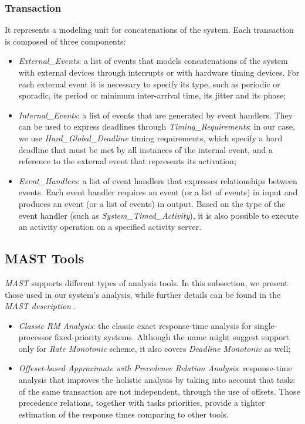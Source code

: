 \subsubsection{Transaction} 
It represents a modeling unit for concatenations of the system. Each transaction
is composed of three components:
\begin{itemize}
    \item \textit{External\_Events}: a list of events that models concatenations
    of the system with external devices through interrupts or with hardware
    timing devices. For each external event it is necessary to specify its type,
    such as periodic or sporadic, its period or minimum inter-arrival time, its
    jitter and its phase;
    \item \textit{Internal\_Events}: a list of events that are generated by
    event handlers. They can be used to express deadlines through
    \textit{Timing\_Requirements}: in our case, we use \textit{Hard\_Global\_Deadline}
    timing requirements, which specify a hard deadline that must be met by all
    instances of the internal event, and a reference to the external event that
    represents its activation;
    \item \textit{Event\_Handlers}: a list of event handlers that
    expresses relationships between events. Each event handler requires an event
    (or a list of events) in input and produces an event (or a list of events) in
    output. Based on the type of the event handler (such as
    \textit{System\_Timed\_Activity}), it is also possible to execute an activity
    operation on a specified activity server. 
\end{itemize}

\subsection{MAST Tools}
\textit{MAST} supports different types of analysis tools. In this subsection, we
present those used in our system's analysis, while further details
can be found in the \textit{MAST description} \cite{descriptionMAST}.
\begin{itemize}
    \item \textit{Classic RM Analysis}: the classic exact response-time analysis
    for single-processor fixed-priority systems.
    Although the name might suggest support only for \textit{Rate Monotonic}
    scheme, it also covers \textit{Deadline Monotonic} as well; 
    \item \textit{Offeset-based Approximate with Precedence Relation Analysis}: 
    response-time analysis that improves the holistic analysis by taking into
    account that tasks of the same transaction are not independent, through the
    use of offsets. Those precedence relations, together with tasks priorities,
    provide a tighter estimation of the response times comparing to other tools. 
\end{itemize}

